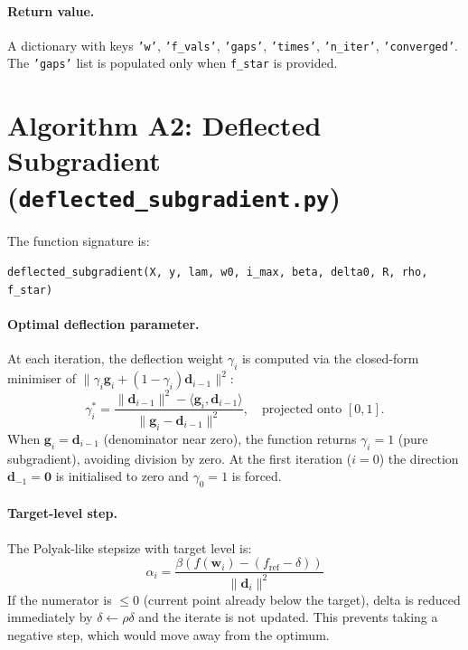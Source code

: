 \paragraph{Return value.}
A dictionary with keys \texttt{'w'}, \texttt{'f\_vals'}, \texttt{'gaps'},
\texttt{'times'}, \texttt{'n\_iter'}, \texttt{'converged'}.
The \texttt{'gaps'} list is populated only when \texttt{f\_star} is provided.

\section{Algorithm A2: Deflected Subgradient (\texttt{deflected\_subgradient.py})}
\label{sec:impl_dsm}

The function signature is:
\begin{center}
\texttt{deflected\_subgradient(X, y, lam, w0, i\_max, beta, delta0, R, rho, f\_star)}
\end{center}

\paragraph{Optimal deflection parameter.}
At each iteration, the deflection weight $\gamma_i$ is computed via the
closed-form minimiser of $\|\gamma_i \mathbf{g}_i + (1-\gamma_i)\mathbf{d}_{i-1}\|^2$:
\[
    \gamma_i^* = \frac{\|\mathbf{d}_{i-1}\|^2 - \langle\mathbf{g}_i,\mathbf{d}_{i-1}\rangle}
    {\|\mathbf{g}_i - \mathbf{d}_{i-1}\|^2},
    \quad \text{projected onto } [0,1].
\]
When $\mathbf{g}_i = \mathbf{d}_{i-1}$ (denominator near zero), the function returns
$\gamma_i = 1$ (pure subgradient), avoiding division by zero.
At the first iteration ($i=0$) the direction $\mathbf{d}_{-1} = \mathbf{0}$ is
initialised to zero and $\gamma_0 = 1$ is forced.

\paragraph{Target-level step.}
The Polyak-like stepsize with target level is:
\[
    \alpha_i = \frac{\beta(f(\mathbf{w}_i) - (f_{\mathrm{ref}} - \delta))}
    {\|\mathbf{d}_i\|^2}
\]
If the numerator is $\leq 0$ (current point already below the target), delta is
reduced immediately by $\delta \leftarrow \rho\delta$ and the iterate is not updated.
This prevents taking a negative step, which would move away from the optimum.

